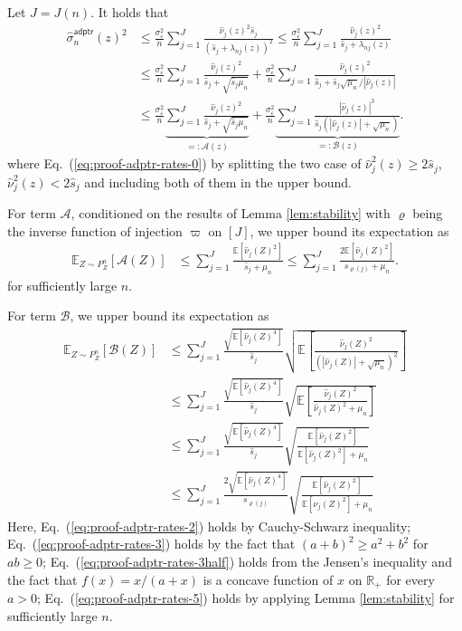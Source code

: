 \documentclass[11pt,a4paper]{article}
\renewcommand{\hat}{\widehat}
\theoremstyle{definition}
\theoremstyle{plain}
\theoremstyle{remark}
\newcommand{\mA}{\mathcal A}
\newcommand{\mB}{\mathcal B}
\newcommand{\adptr}{\mathsf{adptr}}
\begin{document}
Let $J=J(n)$.
It holds that
\begin{align}
\hat\sigma_n^\adptr(z)^2 &\leq \frac{\sigma_\varepsilon^2}{n}\sum_{j=1}^J\frac{\hat\nu_j(z)^2\hat s_j}{(\hat s_j+\lambda_{nj}(z))^2} \leq \frac{\sigma_\varepsilon^2}{n}\sum_{j=1}^J\frac{\hat\nu_j(z)^2}{\hat s_j+\lambda_{nj}(z)}\nonumber\\
&\leq \frac{\sigma_\varepsilon^2}{n}\sum_{j=1}^J\frac{\hat\nu_j(z)^2}{\hat s_j+\sqrt{\hat s_j\mu_n}} + \frac{\sigma_\varepsilon^2}{n}\sum_{j=1}^J\frac{\hat\nu_j(z)^2}{\hat s_j+\hat s_j\sqrt{\mu_n}/|\hat\nu_j(z)|} \label{eq:proof-adptr-rates-0}\\
&\leq  \frac{\sigma_\varepsilon^2}{n}\underbrace{\sum_{j=1}^J\frac{\hat\nu_j(z)^2}{\hat s_j+\sqrt{\hat s_j\mu_n}}}_{=:\mA(z)} + \frac{\sigma_\varepsilon^2}{n}\underbrace{\sum_{j=1}^J\frac{|\hat\nu_j(z)|^3}{\hat s_j(|\hat\nu_j(z)|+\sqrt{\mu_n})}}_{=:\mB(z)}.
\label{eq:proof-adptr-rates-1}
\end{align}
where Eq.~(\ref{eq:proof-adptr-rates-0}) by splitting the two case of $\hat\nu_j^2(z) \geq 2\hat s_j$, $\hat\nu_j^2(z) <2\hat s_j$ and including both of them in the upper bound.

For term $\mA$, conditioned on the results of Lemma \ref{lem:stability} with $\varrho$ being the inverse function of injection $\varpi$ on $[J]$, we upper bound its expectation as
{\color{magenta}
\begin{align}
\mathbb E_{Z\sim P_Z^n}[\mA(Z)] &\leq \sum_{j=1}^J \frac{\mathbb E[\hat\nu_j(Z)^2]}{\hat s_j + \mu_n} \leq \sum_{j=1}^J\frac{2\mathbb E[\hat\nu_j(Z)^2]}{s_{\varrho(j)}+\mu_n}.\label{eq:proof-adptr-sp1}
\end{align}
for sufficiently large $n$.
}

For term $\mB$, we upper bound its expectation as
\begin{align}
\mathbb E_{Z\sim P_Z^n}[\mB(Z)] &\leq \sum_{j=1}^{J}\frac{\sqrt{\mathbb E\left[\hat\nu_j(Z)^4\right]}}{\hat s_j}\sqrt{\mathbb E\left[\frac{\hat\nu_j(Z)^2}{(|\hat\nu_j(Z)|+\sqrt{\mu_n})^2}\right]}\label{eq:proof-adptr-rates-2}\\
&\leq\sum_{j=1}^{J}\frac{\sqrt{\mathbb E\left[\hat\nu_j(Z)^4\right]}}{\hat s_j}\sqrt{\mathbb E\left[\frac{\hat\nu_j(Z)^2}{\hat\nu_j(Z)^2+\mu_n}\right]} \label{eq:proof-adptr-rates-3}\\
&\leq \sum_{j=1}^{J}\frac{\sqrt{\mathbb E\left[\hat\nu_j(Z)^4\right]}}{\hat s_j}\sqrt{\frac{\mathbb E[\hat\nu_j(Z)^2]}{\mathbb E[\hat\nu_j(Z)^2]+\mu_n}}\label{eq:proof-adptr-rates-3half}\\
&\leq \sum_{j=1}^{J}\frac{2\sqrt{\mathbb E\left[\hat\nu_j(Z)^4\right]}}{s_{\varrho(j)}}\sqrt{\frac{\mathbb E[\hat\nu_j(Z)^2]}{\mathbb E[\hat\nu_j(Z)^2]+\mu_n}}\label{eq:proof-adptr-rates-4}
\end{align}
Here, Eq.~(\ref{eq:proof-adptr-rates-2}) holds by Cauchy-Schwarz inequality;
Eq.~(\ref{eq:proof-adptr-rates-3}) holds by the fact that $(a+b)^2\geq a^2+b^2$ {for $a b \geq 0$};
Eq.~(\ref{eq:proof-adptr-rates-3half}) holds from the Jensen's inequality and the fact that $f(x)=x/(a+x)$ is a concave function of $x$ on $\mathbb R_+$ for every $a>0$;
Eq.~(\ref{eq:proof-adptr-rates-5}) holds by applying Lemma \ref{lem:stability} for sufficiently large $n$.
\end{document}
